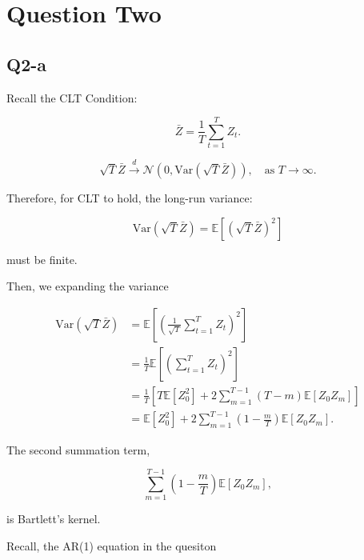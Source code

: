 \documentclass{article} %
\begin{document}
\section*{Question Two}
\subsection{Q2-a}

Recall the CLT Condition: 

\begin{equation}
    \bar{Z} = \frac{1}{T} \sum_{t=1}^{T} Z_t.
\end{equation}

\begin{equation}
    \sqrt{T} \bar{Z} \overset{d}{\to} \mathcal{N} \left( 0, \text{Var}(\sqrt{T} \bar{Z}) \right), \quad \text{as } T \to \infty.
\end{equation}

Therefore, for CLT to hold, the long-run variance:

\begin{equation}
    \text{Var} \left( \sqrt{T} \bar{Z} \right) = \mathbb{E} \left[ \left( \sqrt{T} \bar{Z} \right)^2 \right]
\end{equation}

must be finite.

Then,  we expanding the variance

\begin{align}
    \text{Var} \left( \sqrt{T} \bar{Z} \right) &= \mathbb{E} \left[ \left( \frac{1}{\sqrt{T}} \sum_{t=1}^{T} Z_t \right)^2 \right] \\
    &= \frac{1}{T} \mathbb{E} \left[ \left( \sum_{t=1}^{T} Z_t \right)^2 \right] \\
    &= \frac{1}{T} \left[ T \mathbb{E}[Z_0^2] + 2 \sum_{m=1}^{T-1} (T-m) \mathbb{E}[Z_0 Z_m] \right] \\
    &= \mathbb{E}[Z_0^2] + 2 \sum_{m=1}^{T-1} \left( 1 - \frac{m}{T} \right) \mathbb{E}[Z_0 Z_m].
\end{align}

The second summation term,

\begin{equation}
    \sum_{m=1}^{T-1} \left( 1 - \frac{m}{T} \right) \mathbb{E}[Z_0 Z_m],
\end{equation}

is Bartlett's kernel. 

Recall, the AR(1) equation in the quesiton 
\end{document}
